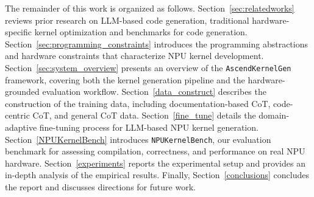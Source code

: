 The remainder of this work is organized as follows.
Section~\ref{sec:relatedworks} reviews prior research on LLM-based code generation, traditional hardware-specific kernel optimization and benchmarks for code generation.
Section~\ref{sec:programming_constraints} introduces the programming abstractions and hardware constraints that characterize NPU kernel development.
Section~\ref{sec:system_overview} presents an overview of the \texttt{AscendKernelGen} framework, covering both the kernel generation pipeline and the hardware-grounded evaluation workflow.
Section~\ref{data_construct} describes the construction of the training data, including documentation-based CoT, code-centric CoT, and general CoT data.
Section~\ref{fine_tune} details the domain-adaptive fine-tuning process for LLM-based NPU kernel generation.
Section~\ref{NPUKernelBench} introduces \texttt{NPUKernelBench}, our evaluation benchmark for assessing compilation, correctness, and performance on real NPU hardware.
Section~\ref{experiments} reports the experimental setup and provides an in-depth analysis of the empirical results.
Finally, Section~\ref{conclusions} concludes the report and discusses directions for future work.